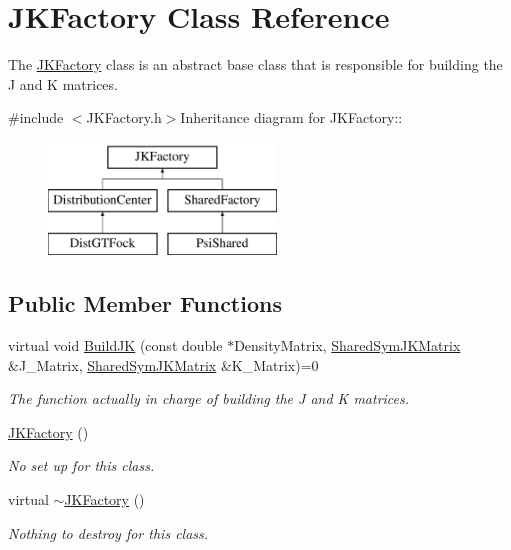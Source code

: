 \hypertarget{classJKBuilder_1_1JKFactory}{
\section{JKFactory Class Reference}
\label{classJKBuilder_1_1JKFactory}
}


The \hyperlink{classJKBuilder_1_1JKFactory}{JKFactory} class is an abstract base class that is responsible for building the J and K matrices.  


{\ttfamily \#include $<$JKFactory.h$>$}Inheritance diagram for JKFactory::\begin{figure}[H]
\begin{center}
\leavevmode
\includegraphics[height=3cm]{classJKBuilder_1_1JKFactory}
\end{center}
\end{figure}
\subsection*{Public Member Functions}
\begin{DoxyCompactItemize}
\item 
virtual void \hyperlink{classJKBuilder_1_1JKFactory_ae253b309dafe3ce003fdabfd315318b8}{BuildJK} (const double $\ast$DensityMatrix, \hyperlink{namespaceJKBuilder_aef21bc37b7cf7bc5ebb5a48628db8d0f}{SharedSymJKMatrix} \&J\_\-Matrix, \hyperlink{namespaceJKBuilder_aef21bc37b7cf7bc5ebb5a48628db8d0f}{SharedSymJKMatrix} \&K\_\-Matrix)=0
\begin{DoxyCompactList}\small\item\em The function actually in charge of building the J and K matrices. \item\end{DoxyCompactList}\item 
\hyperlink{classJKBuilder_1_1JKFactory_a05f3bfba8a8e2c8182393027e6cbbd5c}{JKFactory} ()
\begin{DoxyCompactList}\small\item\em No set up for this class. \item\end{DoxyCompactList}\item 
virtual \hyperlink{classJKBuilder_1_1JKFactory_a9350f429f8b82b14409553f0a2245a7b}{$\sim$JKFactory} ()
\begin{DoxyCompactList}\small\item\em Nothing to destroy for this class. \item\end{DoxyCompactList}\end{DoxyCompactItemize}


